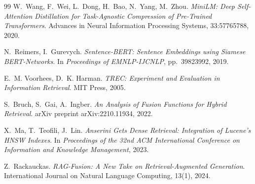 \documentclass[runningheads,a4paper]{llncs}
\begin{document}
\begin{thebibliography}{99}
W.~Wang, F.~Wei, L.~Dong, H.~Bao, N.~Yang, M.~Zhou.
\newblock \textit{MiniLM: Deep Self-Attention Distillation for Task-Agnostic Compression of Pre-Trained Transformers}.
\newblock Advances in Neural Information Processing Systems, 33:5776\textendash{}5788, 2020.

N.~Reimers, I.~Gurevych.
\newblock \textit{Sentence-BERT: Sentence Embeddings using Siamese BERT-Networks}.
\newblock In \textit{Proceedings of EMNLP-IJCNLP}, pp.~3982\textendash{}3992, 2019.

E.~M. Voorhees, D.~K. Harman.
\newblock \textit{TREC: Experiment and Evaluation in Information Retrieval}.
\newblock MIT Press, 2005.

S.~Bruch, S.~Gai, A.~Ingber.
\newblock \textit{An Analysis of Fusion Functions for Hybrid Retrieval}.
\newblock arXiv preprint arXiv:2210.11934, 2022.

X.~Ma, T.~Teofili, J.~Lin.
\newblock \textit{Anserini Gets Dense Retrieval: Integration of Lucene's HNSW Indexes}.
\newblock In \textit{Proceedings of the 32nd ACM International Conference on Information and Knowledge Management}, 2023.

Z.~Rackauckas.
\newblock \textit{RAG-Fusion: A New Take on Retrieval-Augmented Generation}.
\newblock International Journal on Natural Language Computing, 13(1), 2024.

\end{thebibliography}

\clearpage

\end{document}
